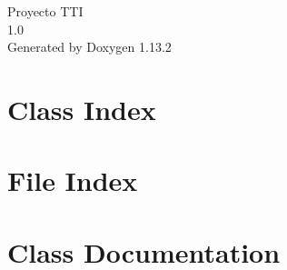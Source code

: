 \documentclass[twoside]{book}
\newcommand{\+}{\discretionary{\mbox{\scriptsize$\hookleftarrow$}}{}{}}
\newcommand{\clearemptydoublepage}{%
    \newpage{\pagestyle{empty}\cleardoublepage}%
  }
\begin{document}
  \raggedbottom
    \hypersetup{pageanchor=false,
                bookmarksnumbered=true,
                pdfencoding=unicode
               }
  \begin{titlepage}
  \vspace*{7cm}
  \begin{center}%
  {\Large Proyecto TTI}\\
  [1ex]\large 1.\+0 \\
  \vspace*{1cm}
  {\large Generated by Doxygen 1.13.2}\\
  \end{center}
  \end{titlepage}
  \clearemptydoublepage
  \tableofcontents
  \clearemptydoublepage
  \hypersetup{pageanchor=true}

\chapter{Class Index}

\chapter{File Index}

\chapter{Class Documentation}




\end{document}
